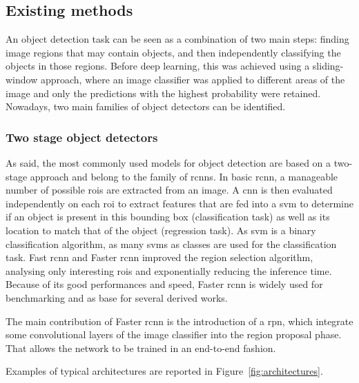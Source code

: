 \documentclass[%
    corpo=12pt,
    twoside,
    stile=classica,   
    tipotesi=magistrale,
    evenboxes,
    english,
	numerazioneromana,
]{toptesi}
\begin{document}
\subsection{Existing methods}\label{sec:detectors}
An object detection task can be seen as a combination of two main steps: finding image regions that may contain objects, and then independently classifying the objects in those regions. Before deep learning, this was achieved using a sliding-window approach, where an image classifier was applied to different areas of the image and only the predictions with the highest probability were retained. Nowadays, two main families of object detectors can be identified.

\subsubsection{Two stage object detectors}
As said, the most commonly used models for object detection are based on a two-stage approach and belong to the family of \glspl{rcnn}. In basic \acrshort{rcnn}\cite{girshick2014rich}, a manageable number of possible \glspl{roi} are extracted from an image. A \gls{cnn} is then evaluated independently on each \acrshort{roi} to extract features that are fed into a \gls{svm}
to determine if an object is present in this bounding box (classification task) as well as its location to match that of the object (regression task). As \gls{svm} is a binary classification algorithm, as many \glspl{svm} as classes are used for the classification task.
Fast \acrshort{rcnn}\cite{girshick2015fast} and Faster \acrshort{rcnn}\cite{ren2016faster} improved the region selection algorithm, analysing only interesting \glspl{roi} and exponentially reducing the inference time. Because of its good performances and speed, Faster \acrshort{rcnn} is widely used for benchmarking and as base for several derived works.

The main contribution of Faster \acrshort{rcnn} is the introduction of a \gls{rpn}, which integrate some convolutional layers of the image classifier into the region proposal phase. That allows the network to be trained in an end-to-end fashion.

Examples of typical architectures are reported in Figure~\ref{fig:architectures}.
\end{document}
